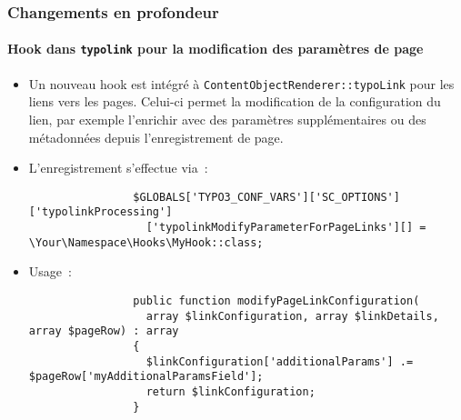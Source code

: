 \begin{frame}[fragile]
	\frametitle{Changements en profondeur}
	\framesubtitle{Hook dans \texttt{typolink} pour la modification des paramètres de page}

	\lstset{basicstyle=\tiny\ttfamily}

	\begin{itemize}
		\item Un nouveau hook est intégré à \texttt{ContentObjectRenderer::typoLink} pour les liens vers les pages.
			Celui-ci permet la modification de la configuration du lien, par exemple l'enrichir avec des paramètres
			supplémentaires ou des métadonnées depuis l'enregistrement de page.

		\item L'enregistrement s'effectue via~:

			\begin{lstlisting}
				$GLOBALS['TYPO3_CONF_VARS']['SC_OPTIONS']['typolinkProcessing']
				  ['typolinkModifyParameterForPageLinks'][] = \Your\Namespace\Hooks\MyHook::class;
			\end{lstlisting}

		\item Usage~:

			\begin{lstlisting}
				public function modifyPageLinkConfiguration(
				  array $linkConfiguration, array $linkDetails, array $pageRow) : array
				{
				  $linkConfiguration['additionalParams'] .= $pageRow['myAdditionalParamsField'];
				  return $linkConfiguration;
				}
			\end{lstlisting}

	\end{itemize}

\end{frame}


